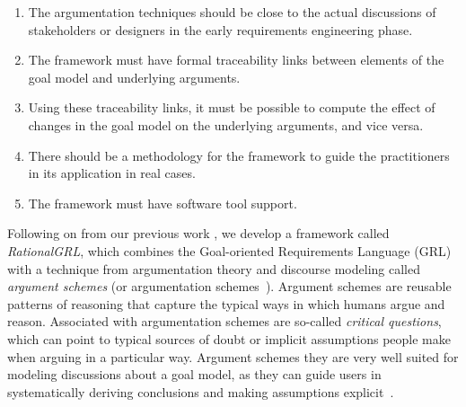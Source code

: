 \begin{enumerate}
\item 
The argumentation techniques should be close to the actual discussions of stakeholders or designers in the early requirements engineering phase.
\item 
The framework must have formal traceability links between elements of the goal model and underlying arguments.
\item 
Using these traceability links, it must be possible to compute the effect of changes in the goal model on the underlying arguments, and vice versa.
\item 
There should be a methodology for the framework to guide the practitioners in its application in real cases.
\item 
The framework must have software tool support.
\end{enumerate}




Following on from our previous work \cite{vanzee-etal:renext2015,vanZee-etal:er2016}, we develop a framework called \emph{RationalGRL}, which combines the Goal-oriented Requirements Language (GRL)~\cite{Amyot:2010:EGM:1841349.1841356} with a technique from argumentation theory and discourse modeling called \emph{argument schemes} (or argumentation schemes~\cite{walton-etal2008}). Argument schemes are reusable patterns of reasoning that capture the typical ways in which humans argue and reason. Associated with argumentation schemes are so-called \emph{critical questions}, which can point to typical sources of doubt or implicit assumptions people make when arguing in a particular way. Argument schemes they are very well suited for modeling discussions about a goal model, as they can guide users in systematically deriving conclusions and making assumptions explicit~\cite{murukannaiah2015}. 

